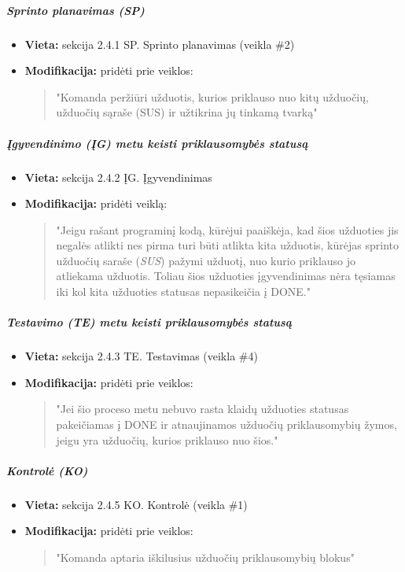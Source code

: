 \documentclass{article}
\begin{document}
\subparagraph{Sprinto planavimas (SP)}
\begin{itemize}
    \item \textbf{Vieta:} sekcija 2.4.1 SP. Sprinto planavimas (veikla \#2)
    \item \textbf{Modifikacija:} pridėti prie veiklos:
    \begin{quote}
        "Komanda peržiūri užduotis, kurios priklauso nuo kitų užduočių, užduočių sąraše (SUS) ir užtikrina jų tinkamą tvarką"
    \end{quote}
\end{itemize}

\subparagraph{Įgyvendinimo (ĮG) metu keisti priklausomybės statusą}
\begin{itemize}
    \item \textbf{Vieta:} sekcija 2.4.2 ĮG. Įgyvendinimas
    \item \textbf{Modifikacija:} pridėti veiklą:
    \begin{quote}
        "Jeigu rašant programinį kodą, kūrėjui paaiškėja, kad šios užduoties jis negalės atlikti nes pirma turi būti atlikta kita užduotis, kūrėjas sprinto užduočių saraše (\textit{SUS}) pažymi užduotį, nuo kurio priklauso jo atliekama užduotis. Toliau šios užduoties įgyvendinimas nėra tęsiamas iki kol kita užduoties statusas nepasikeičia į DONE."
    \end{quote}
\end{itemize}

\subparagraph{Testavimo (TE) metu keisti priklausomybės statusą}
\begin{itemize}
    \item \textbf{Vieta:} sekcija 2.4.3 TE. Testavimas (veikla \#4)
    \item \textbf{Modifikacija:} pridėti prie veiklos:
    \begin{quote}
        "Jei šio proceso metu nebuvo rasta klaidų užduoties statusas pakeičiamas į DONE ir atnaujinamos užduočių priklausomybių žymos, jeigu yra užduočių, kurios priklauso nuo šios."
    \end{quote}
\end{itemize}

\subparagraph{Kontrolė (KO)}
\begin{itemize}
    \item \textbf{Vieta:} sekcija 2.4.5 KO. Kontrolė (veikla \#1)
    \item \textbf{Modifikacija:} pridėti prie veiklos:
    \begin{quote}
        "Komanda aptaria iškilusius užduočių priklausomybių blokus"
    \end{quote}
\end{itemize}
\end{document}
